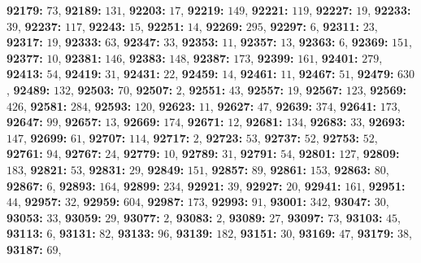 \textsf{\bfseries 92179:} $73$, \textsf{\bfseries 92189:} $131$, \textsf{\bfseries 92203:} $17$, \textsf{\bfseries 92219:} $149$, \textsf{\bfseries 92221:} $119$, \textsf{\bfseries 92227:} $19$, \textsf{\bfseries 92233:} $39$, \textsf{\bfseries 92237:} $117$, \textsf{\bfseries 92243:} $15$, \textsf{\bfseries 92251:} $14$, \textsf{\bfseries 92269:} $295$, \textsf{\bfseries 92297:} $6$, \textsf{\bfseries 92311:} $23$, \textsf{\bfseries 92317:} $19$, \textsf{\bfseries 92333:} $63$, \textsf{\bfseries 92347:} $33$, \textsf{\bfseries 92353:} $11$, \textsf{\bfseries 92357:} $13$, \textsf{\bfseries 92363:} $6$, \textsf{\bfseries 92369:} $151$, \textsf{\bfseries 92377:} $10$, \textsf{\bfseries 92381:} $146$, \textsf{\bfseries 92383:} $148$, \textsf{\bfseries 92387:} $173$, \textsf{\bfseries 92399:} $161$, \textsf{\bfseries 92401:} $279$, \textsf{\bfseries 92413:} $54$, \textsf{\bfseries 92419:} $31$, \textsf{\bfseries 92431:} $22$, \textsf{\bfseries 92459:} $14$, \textsf{\bfseries 92461:} $11$, \textsf{\bfseries 92467:} $51$, \textsf{\bfseries 92479:} $630$, \textsf{\bfseries 92489:} $132$, \textsf{\bfseries 92503:} $70$, \textsf{\bfseries 92507:} $2$, \textsf{\bfseries 92551:} $43$, \textsf{\bfseries 92557:} $19$, \textsf{\bfseries 92567:} $123$, \textsf{\bfseries 92569:} $426$, \textsf{\bfseries 92581:} $284$, \textsf{\bfseries 92593:} $120$, \textsf{\bfseries 92623:} $11$, \textsf{\bfseries 92627:} $47$, \textsf{\bfseries 92639:} $374$, \textsf{\bfseries 92641:} $173$, \textsf{\bfseries 92647:} $99$, \textsf{\bfseries 92657:} $13$, \textsf{\bfseries 92669:} $174$, \textsf{\bfseries 92671:} $12$, \textsf{\bfseries 92681:} $134$, \textsf{\bfseries 92683:} $33$, \textsf{\bfseries 92693:} $147$, \textsf{\bfseries 92699:} $61$, \textsf{\bfseries 92707:} $114$, \textsf{\bfseries 92717:} $2$, \textsf{\bfseries 92723:} $53$, \textsf{\bfseries 92737:} $52$, \textsf{\bfseries 92753:} $52$, \textsf{\bfseries 92761:} $94$, \textsf{\bfseries 92767:} $24$, \textsf{\bfseries 92779:} $10$, \textsf{\bfseries 92789:} $31$, \textsf{\bfseries 92791:} $54$, \textsf{\bfseries 92801:} $127$, \textsf{\bfseries 92809:} $183$, \textsf{\bfseries 92821:} $53$, \textsf{\bfseries 92831:} $29$, \textsf{\bfseries 92849:} $151$, \textsf{\bfseries 92857:} $89$, \textsf{\bfseries 92861:} $153$, \textsf{\bfseries 92863:} $80$, \textsf{\bfseries 92867:} $6$, \textsf{\bfseries 92893:} $164$, \textsf{\bfseries 92899:} $234$, \textsf{\bfseries 92921:} $39$, \textsf{\bfseries 92927:} $20$, \textsf{\bfseries 92941:} $161$, \textsf{\bfseries 92951:} $44$, \textsf{\bfseries 92957:} $32$, \textsf{\bfseries 92959:} $604$, \textsf{\bfseries 92987:} $173$, \textsf{\bfseries 92993:} $91$, \textsf{\bfseries 93001:} $342$, \textsf{\bfseries 93047:} $30$, \textsf{\bfseries 93053:} $33$, \textsf{\bfseries 93059:} $29$, \textsf{\bfseries 93077:} $2$, \textsf{\bfseries 93083:} $2$, \textsf{\bfseries 93089:} $27$, \textsf{\bfseries 93097:} $73$, \textsf{\bfseries 93103:} $45$, \textsf{\bfseries 93113:} $6$, \textsf{\bfseries 93131:} $82$, \textsf{\bfseries 93133:} $96$, \textsf{\bfseries 93139:} $182$, \textsf{\bfseries 93151:} $30$, \textsf{\bfseries 93169:} $47$, \textsf{\bfseries 93179:} $38$, \textsf{\bfseries 93187:} $69$, 
